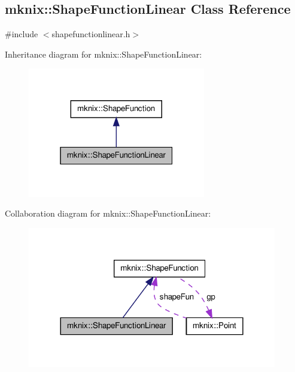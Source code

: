 \hypertarget{classmknix_1_1_shape_function_linear}{\subsection{mknix\-:\-:Shape\-Function\-Linear Class Reference}
\label{classmknix_1_1_shape_function_linear}
}


{\ttfamily \#include $<$shapefunctionlinear.\-h$>$}



Inheritance diagram for mknix\-:\-:Shape\-Function\-Linear\-:\nopagebreak
\begin{figure}[H]
\begin{center}
\leavevmode
\includegraphics[width=220pt]{d7/de5/classmknix_1_1_shape_function_linear__inherit__graph}
\end{center}
\end{figure}


Collaboration diagram for mknix\-:\-:Shape\-Function\-Linear\-:\nopagebreak
\begin{figure}[H]
\begin{center}
\leavevmode
\includegraphics[width=308pt]{dd/d38/classmknix_1_1_shape_function_linear__coll__graph}
\end{center}
\end{figure}
